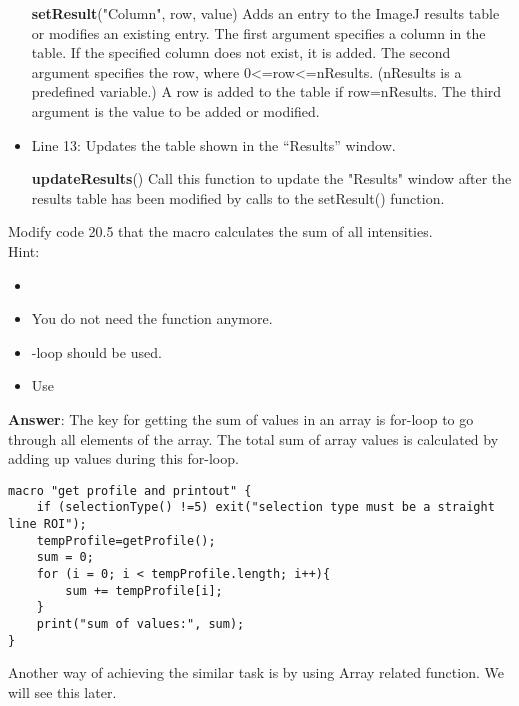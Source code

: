 \begin{itemize}
\begin{indentCom}
\textbf{setResult}("Column", row, value)
Adds an entry to the ImageJ results table or modifies an existing entry. The first argument specifies a column in the table. If the specified column does not exist, it is added. The second argument specifies the row, where 0<=row<=nResults. (nResults is a predefined variable.) A row is added to the table if row=nResults. The third argument is the value to be added or modified. 
\end{indentCom}
\item Line 13: Updates the table shown in the ``Results'' window. 

\begin{indentCom}
\textbf{updateResults}()
Call this function to update the "Results" window after the results table has been modified by calls to the setResult() function. 
\end{indentCom}
\end{itemize}

\begin{indentexercise}{1}
Modify code 20.5 that the macro calculates the sum of all intensities.\\

Hint:

\begin{itemize}
\item
\item You do not need the function anymore. 
\item {}-loop should be used.
\item Use 
\end{itemize}

\item \textbf{Answer}: The key for getting the sum of values in an array is for-loop to go through all elements of the array. The total sum of array values is calculated by adding up values during this for-loop.   
\begin{lstlisting}[numbers=none]
macro "get profile and printout" {
	if (selectionType() !=5) exit("selection type must be a straight line ROI");
	tempProfile=getProfile();
	sum = 0;
	for (i = 0; i < tempProfile.length; i++){
		sum += tempProfile[i];
	}
	print("sum of values:", sum);
}  
\end{lstlisting}

Another way of achieving the similar task is by using Array related function. We will see this later. 
\end{indentexercise}
